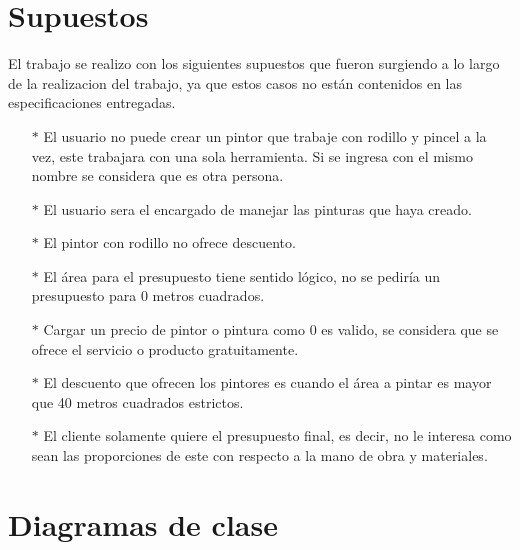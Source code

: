 \documentclass[titlepage,a4paper]{article}
\begin{document}
\section{Supuestos}\label{sec:supuestos}
El trabajo se realizo con los siguientes supuestos que fueron surgiendo a lo largo de la realizacion del trabajo, ya que estos casos no están contenidos en las especificaciones entregadas.\\
\begin{itemize}
    \item [$*$] El usuario no puede crear un pintor que trabaje con rodillo y pincel a la vez, este trabajara con una sola herramienta. Si se ingresa con el mismo nombre se considera que es otra persona.
    \item [$*$] El usuario sera el encargado de manejar las pinturas que haya creado.
    \item [$*$] El pintor con rodillo no ofrece descuento.
    \item [$*$] El área para el presupuesto tiene sentido lógico, no se pediría un presupuesto para 0 metros cuadrados.
    \item [$*$] Cargar un precio de pintor o pintura como 0 es valido, se considera que se ofrece el servicio o producto gratuitamente.
    \item [$*$] El descuento que ofrecen los pintores es cuando el área a pintar es mayor que 40 metros cuadrados estrictos.
    \item [$*$] El cliente solamente quiere el presupuesto final, es decir, no le interesa como sean las proporciones de este con respecto a la mano de obra y materiales.
\end{itemize}
 
\newpage




\section{Diagramas de clase}\label{sec:diagramasdeclase}
\end{document}
